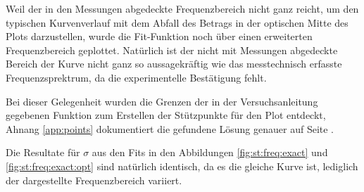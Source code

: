 {\begin{minipage}[t]{0.33\textwidth}
        \vspace{1em}

        Weil  der  in  den  Messungen abgedeckte  Frequenzbereich  nicht  ganz
        reicht, um den  typischen Kurvenverlauf mit dem Abfall  des Betrags in
        der  optischen Mitte  des Plots  darzustellen, wurde  die Fit-Funktion
        noch \"uber  einen erweiterten  Frequenzbereich geplottet. Nat\"urlich
        ist der nicht mit Messungen abgedeckte Bereich der Kurve nicht ganz so
        aussagekr\"aftig wie das  messtechnisch erfasste Frequenzsprektrum, da
        die experimentelle Best\"atigung fehlt.

        Bei dieser Gelegenheit wurden die Grenzen der in der Versuchsanleitung
        gegebenen  Funktion zum  Erstellen  der St\"utzpunkte  f\"ur den  Plot
        entdeckt, Ahnang \ref{app:points}  dokumentiert die gefundene L\"osung
        genauer auf Seite \pageref{app:points}.

        Die    Resultate    f\"ur   $\sigma$    aus    den    Fits   in    den
        Abbildungen  \ref{fig:st:freq:exact}  und  \ref{fig:st:freq:exact:opt}
        sind nat\"urlich identisch, da es die gleiche Kurve ist, lediglich der
        dargestellte Frequenzbereich variiert.
	\end{minipage}%
	\begin{minipage}[t]{0.67\textwidth}
        \vspace{0pt}
        \resizebox{.95\textwidth}{!}{}
        \label{fig:st:freq:exact:opt}
	\end{minipage}

}
